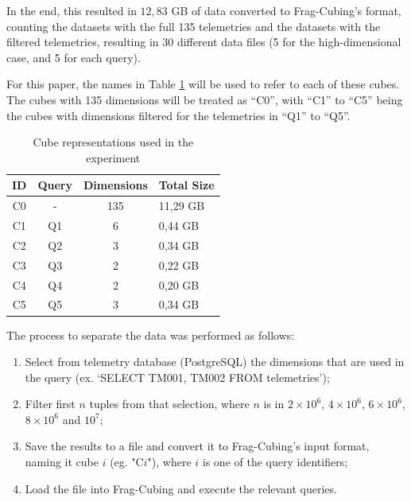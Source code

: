 In the end, this resulted in $12,83$ GB of data converted to Frag-Cubing's format, counting the datasets with the full 135 telemetries and the datasets with the filtered telemetries, resulting in 30 different data files (5 for the high-dimensional case, and 5 for each query).

For this paper, the names in Table \ref{tab:cubenotation} will be used to refer to each of these cubes.
The cubes with 135 dimensions will be treated as ``C0'', with ``C1'' to ``C5'' being the cubes with dimensions filtered for the telemetries in ``Q1'' to ``Q5''.


\begin{table}[H]
  \caption{Cube representations used in the experiment}\label{tab:cubenotation}
  \centering
  \begin{tabular}{|c|c|c|p{2cm}|}
    \hline
    \bfseries ID &\bfseries Query &\bfseries Dimensions &\bfseries Total Size\\
    \hline
    C0 & - & 135 & 11,29 GB \\
    \hline
    C1 & Q1 & 6 & 0,44 GB \\
    \hline
    C2 & Q2 & 3 & 0,34 GB \\
    \hline
    C3 & Q3 & 2 & 0,22 GB \\
    \hline
    C4 & Q4 & 2 & 0,20 GB \\
    \hline
    C5 & Q5 & 3 & 0,34 GB \\
    \hline
  \end{tabular}
\end{table}

The process to separate the data was performed as follows:

\begin{enumerate}[noitemsep]
  \item Select from telemetry database (PostgreSQL) the dimensions that are used in the query (ex. `SELECT TM001, TM002 FROM telemetries');
  \item Filter first $n$ tuples from that selection, where $n$ is in \(\ensuremath{2\times 10^{6}}\), \(\ensuremath{4\times 10^{6}}\), \(\ensuremath{6\times 10^{6}}\), \(\ensuremath{8\times 10^{6}}\) and \(\ensuremath{10^{7}}\);
  \item Save the results to a file and convert it to Frag-Cubing's input format, naming it cube $i$ (eg. "C$i$"), where $i$ is one of the query identifiers;
  \item Load the file into Frag-Cubing and execute the relevant queries.
\end{enumerate}

